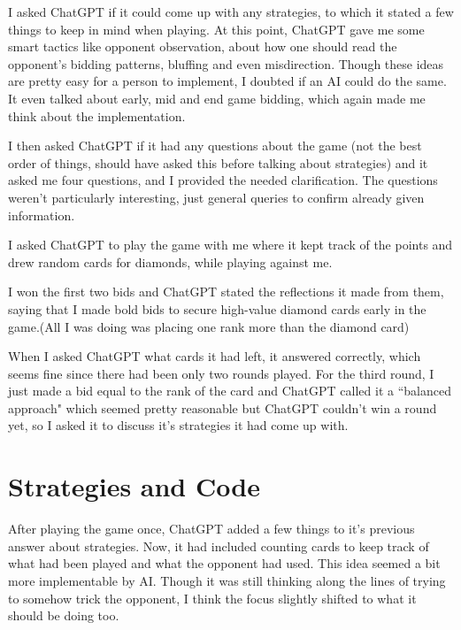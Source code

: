 \documentclass{article}
\begin{document}
I asked ChatGPT if it could come up with any strategies, to which it stated a few things to keep in mind when playing. At this point, ChatGPT gave me some smart tactics like opponent observation, about how one should read the opponent's bidding patterns, bluffing and even misdirection. Though these ideas are pretty easy for a person to implement, I doubted if an AI could do the same. It even talked about early, mid and end game bidding, which again made me think about the implementation. \newline

I then asked ChatGPT if it had any questions about the game (not the best order of things, should have asked this before talking about strategies) and it asked me four questions, and I provided the needed clarification. The questions weren't particularly interesting, just general queries to confirm already given information. \newline

I asked ChatGPT to play the game with me where it kept track of the points and drew random cards for diamonds, while playing against me. \newline

I won the first two bids and ChatGPT stated the reflections it made from them, saying that I made bold bids to secure high-value diamond cards early in the game.(All I was doing was placing one rank more than the diamond card) \newline

When I asked ChatGPT what cards it had left, it answered correctly, which seems fine since there had been only two rounds played. For the third round, I just made a bid equal to the rank of the card and ChatGPT called it a ``balanced approach" which seemed pretty reasonable but ChatGPT couldn't win a round yet, so I asked it to discuss it's strategies it had come up with. \newline

\section{Strategies and Code}
After playing the game once, ChatGPT added a few things to it's previous answer about strategies. Now, it had included counting cards to keep track of what had been played and what the opponent had used. This idea seemed a bit more implementable by AI. Though it was still thinking along the lines of trying to somehow trick the opponent, I think the focus slightly shifted to what it should be doing too. \newline
\end{document}
